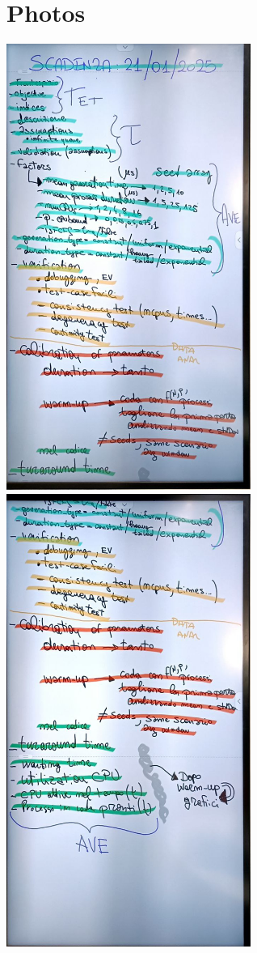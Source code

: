 \chapter{Photos}

\includegraphics[width=0.6\textwidth]{images/example/pag1.jpeg}
\includegraphics[width=0.6\textwidth]{images/example/pag2.jpeg}